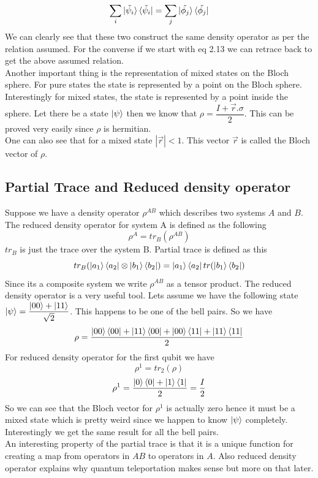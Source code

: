 \documentclass{report}
\begin{document}
\begin{equation}\sum_{i}\ket{\tilde{\psi_i}}\bra{\tilde{\psi_i}} = \sum_{j}\ket{\tilde{\phi_j}}\bra{\tilde{\phi_j}}\end{equation}
We can clearly see that these two construct the same density operator as per the relation assumed. For the converse if we start with eq 2.13 we can retrace back to get the above assumed relation.\\
Another important thing is the representation of mixed states on the Bloch sphere. For pure states the state is represented by a point on the Bloch sphere. Interestingly for mixed states, the state is represented by a point inside the sphere. Let there be a state $\ket{\psi}$ then we know that $\rho = \dfrac{I + \vec{r}.\sigma}{2}$. This can be proved very easily since $\rho$ is hermitian.\\
One can also see that for a mixed state $|\vec{r}| < 1$. This vector $\vec{r}$ is called the Bloch vector of $\rho$.

\subsection{Partial Trace and Reduced density operator}
Suppose we have a density operator $\rho^{AB}$ which describes two systems $A$ and $B$. The reduced density operator for system A is defined as the following
$$\rho^{A} = tr_{B}(\rho^{AB})$$
$tr_{B}$ is just the trace over the system B. Partial trace is defined as this
$$tr_{B}(\ket{a_1}\bra{a_2} \otimes \ket{b_1}\bra{b_2}) = \ket{a_1}\bra{a_2}tr(\ket{b_1}\bra{b_2})$$
Since its a composite system we write $\rho^{AB}$ as a tensor product. The reduced density operator is a very useful tool. Lets assume we have the following state $\ket{\psi} = \dfrac{\ket{00} + \ket{11}}{\sqrt{2}}$. This happens to be one of the bell pairs. So we have
\begin{equation}\rho = \dfrac{\ket{00}\bra{00} + \ket{11}\bra{00} + \ket{00}\bra{11} + \ket{11}\bra{11}}{2}\end{equation}
For reduced density operator for the first qubit we have
\begin{equation}\rho^1 = tr_{2}(\rho)\end{equation}
\begin{equation}\rho^1 = \dfrac{\ket{0}\bra{0} + \ket{1}\bra{1}}{2} = \dfrac{I}{2}\end{equation}
So we can see that the Bloch vector for $\rho^1$ is actually zero hence it must be a mixed state which is pretty weird since we happen to know $\ket{\psi}$ completely. Interestingly we get the same result for all the bell pairs.\\
An interesting property of the partial trace is that it is a unique function for creating a map from operators in $AB$ to operators in $A$. Also reduced density operator explains why quantum teleportation makes sense but more on that later.
\end{document}
